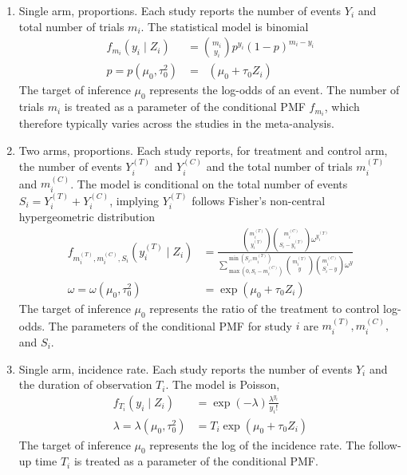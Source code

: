 \documentclass[12pt]{article}
\DeclareMathOperator{\expit}{logit^{-1}}
\newcommand{\Z}{Z}
\newcommand{\Y}{Y}
\newcommand{\y}{y}
\newcommand{\T}[1]{{#1}^{(T)}}
\newcommand{\C}[1]{{#1}^{(C)}}
\newcommand{\m}{m}
\newcommand{\munull}{\mu_0}
\newcommand{\tausqnull}{\tau^2_{0}}
\newcommand{\taunull}{\tau_0}
\begin{document}
\begin{enumerate}
\item Single arm, proportions. Each study reports the number of events $\Y_i$ and total number of trials $\m_i$.  The statistical model is binomial
  \begin{equation}
    \begin{split}
      f_{\m_i}(\y_i\mid \Z_i) &=  {\m_i \choose \y_i}p^{\y_i}(1-p)^{\m_i-\y_i}\\
  p = p(\munull,\tausqnull) &= \expit(\munull + \taunull\Z_i)
\end{split}
\label{mod:bn-prop}
\end{equation}
The target of inference $\munull$ represents the log-odds  of an event. The number of trials $\m_i$ is treated as a parameter of the conditional PMF $f_{m_i}$, which therefore typically varies across the studies in the meta-analysis.

\item Two arms, proportions. Each study reports, for treatment and control arm, the number of events $\T{\Y}_i$ and $\C{\Y}_i$ and the total number of trials $\T{\m}_i$ and $\C{\m}_i$. The model is conditional on the total number of events $S_i=\T{\Y}_i+\C{\Y}_i$, implying $\T{\Y}_i$ follows Fisher's non-central hypergeometric distribution
  \begin{equation}
    \begin{split}
      f_{\T{\m}_i,\C{\m}_i,S_i}(\T{\y}_i \mid \Z_i) &= \frac{{\T{\m}_i\choose \T{\y}_i}{\C{\m}_i\choose S_i-\T{\y}_i}\omega^{\T{\y}_i}}
  {\sum_{\max(0,S_i-\C{\m}_i)}^{\min(S_i,\T{\m}_i)}
                               {\T{\m}_i\choose \y}{\C{\m}_i\choose S_i-\y}\omega^{ \y}}\\
  \omega = \omega(\munull,\tausqnull) &= \exp(\munull + \taunull\Z_i)
\end{split}
\label{mod:hn}
\end{equation}
The target of inference $\munull$ represents the ratio of the treatment to control log-odds. The parameters of the conditional PMF for study $i$ are $\T{\m}_i, \C{\m}_i,$ and $S_i$.

\item Single arm, incidence rate. Each study reports the number
of events $\Y_i$ and the duration of observation $T_i$.  The model is
Poisson,
  \begin{equation}
    \begin{split}
  f_{T_i}(\y_i\mid \Z_i) &= \exp(-\lambda)\frac{\lambda^{\y_i}}{\y_i!}\\
  \lambda = \lambda(\munull,\tausqnull) &= T_i\exp(\munull + \taunull\Z_i)
\end{split}
\label{mod:pn}
\end{equation}
The target of
inference $\munull$ represents the log of the incidence rate. The follow-up time $T_i$ is treated as a parameter of the conditional PMF.


\end{enumerate}
\end{document}
